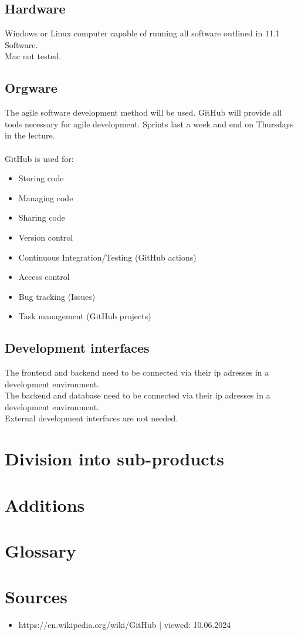 \documentclass[]{article}
\begin{document}
	\subsection{Hardware}
		Windows or Linux computer capable of running all software outlined in 11.1 Software.\\
		Mac not tested.
	\subsection{Orgware}
		The agile software development method will be used. GitHub will provide all tools necessary for agile development. Sprints last a week and end on Thursdays in the lecture.\\
		\\
		GitHub is used for:
		\begin{itemize}
			\item Storing code
			\item Managing code
			\item Sharing code
			\item Version control
			\item Continuous Integration/Testing (GitHub actions)
			\item Access control
			\item Bug tracking (Issues)
			\item Task management (GitHub projects)
		\end{itemize}
	\subsection{Development interfaces}
		The frontend and backend need to be connected via their ip adresses in a development environment.\\
		The backend and database need to be connected via their ip adresses in a development environment.\\
		External development interfaces are not needed.
\section{Division into sub-products}
\section{Additions}
\section{Glossary}
\section{Sources}
	\begin{itemize}
		\item https://en.wikipedia.org/wiki/GitHub | viewed: 10.06.2024
	\end{itemize}
\end{document}
